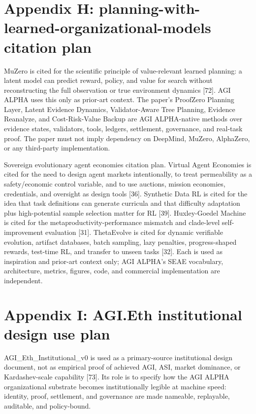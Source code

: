 \documentclass[
  11pt,
]{article}
\begin{document}
\section{Appendix H: planning-with-learned-organizational-models
citation
plan}\label{appendix-h-planning-with-learned-organizational-models-citation-plan}

MuZero is cited for the scientific principle of value-relevant learned
planning: a latent model can predict reward, policy, and value for
search without reconstructing the full observation or true environment
dynamics {[}72{]}. AGI ALPHA uses this only as prior-art context. The
paper's ProofZero Planning Layer, Latent Evidence Dynamics,
Validator-Aware Tree Planning, Evidence Reanalyze, and Cost-Risk-Value
Backup are AGI ALPHA-native methods over evidence states, validators,
tools, ledgers, settlement, governance, and real-task proof. The paper
must not imply dependency on DeepMind, MuZero, AlphaZero, or any
third-party implementation.

Sovereign evolutionary agent economies citation plan. Virtual Agent
Economies is cited for the need to design agent markets intentionally,
to treat permeability as a safety/economic control variable, and to use
auctions, mission economies, credentials, and oversight as design tools
{[}36{]}. Synthetic Data RL is cited for the idea that task definitions
can generate curricula and that difficulty adaptation plus
high-potential sample selection matter for RL {[}39{]}. Huxley-Goedel
Machine is cited for the metaproductivity-performance mismatch and
clade-level self-improvement evaluation {[}31{]}. ThetaEvolve is cited
for dynamic verifiable evolution, artifact databases, batch sampling,
lazy penalties, progress-shaped rewards, test-time RL, and transfer to
unseen tasks {[}32{]}. Each is used as inspiration and prior-art context
only; AGI ALPHA's SEAE vocabulary, architecture, metrics, figures, code,
and commercial implementation are independent.

\section{Appendix I: AGI.Eth institutional design use
plan}\label{appendix-i-agi.eth-institutional-design-use-plan}

AGI\_Eth\_Institutional\_v0 is used as a primary-source institutional
design document, not as empirical proof of achieved AGI, ASI, market
dominance, or Kardashev-scale capability {[}73{]}. Its role is to
specify how the AGI ALPHA organizational substrate becomes
institutionally legible at machine speed: identity, proof, settlement,
and governance are made nameable, replayable, auditable, and
policy-bound.
\end{document}
